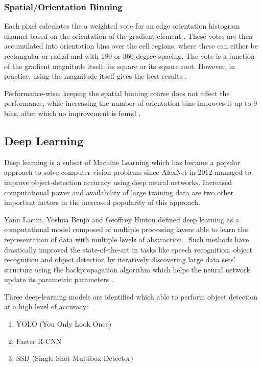 \subsubsection{Spatial/Orientation Binning}

Each pixel calculates the a weighted vote for an edge orientation histogram channel based on the orientation of the gradient element \cite{paper:dalal2005histograms}. These votes are then accumulated into orientation bins over the cell regions, where these can either be rectangular or radial and with 180\textdegree{} or 360\textdegree{} degree spacing. The vote is a function of the gradient magnitude itself, its square or its square root. However, in practice, using the magnitude itself gives the best results \cite{paper:dalal2005histograms}.

Performance-wise, keeping the spatial binning coarse does not affect the performance, while increasing the number of orientation bins improves it up to 9 bins, after which no improvement is found \cite{paper:dalal2005histograms}.

\subsection{Deep Learning}

Deep learning is a subset of Machine Learning which has became a popular approach to solve computer vision problems since AlexNet in 2012 managed to improve object-detection accuracy using deep neural networks. Increased computational power and availability of large training data are two other important factors in the increased popularity of this approach.

Yann Lacun, Yoshua Benjo and Geoffrey Hinton defined deep learning as a computational model composed of multiple processing layers able to learn the representation of data with multiple levels of abstraction \cite{paper:lecun2015deep}. Such methods have drastically improved the state-of-the-art in tasks like speech recognition, object recognition and object detection by iteratively discovering large data sets' structure using the backpropagation algorithm which helps the neural network update its parametric parameters \cite{paper:lecun2015deep}.

Three deep-learning models are identified which able to perform object detection at a high level of accuracy:

\begin{enumerate}
  \item YOLO (You Only Look Once) \cite{paper:YOLO}
  \item Faster R-CNN \cite{paper:FRCNN}
  \item SSD (Single Shot Multibox Detector) \cite{paper:SSD}
\end{enumerate}

